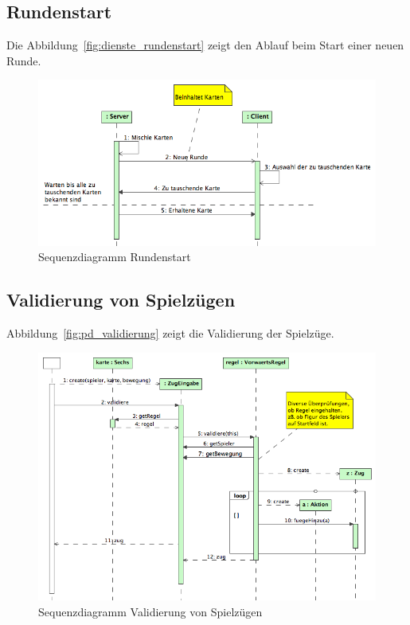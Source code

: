 \documentclass[12pt,halfparskip]{scrartcl}
\begin{document}
\subsection{Rundenstart}
\label{sub:rundenstart}
Die Abbildung~\vref{fig:dienste_rundenstart} zeigt den Ablauf beim Start einer neuen Runde.
\begin{figure}[h]
	\centering
	\includegraphics[width=0.7 \textwidth]{dienste_rundenstart}
	\caption{Sequenzdiagramm Rundenstart}
	\label{fig:dienste_rundenstart}
\end{figure}

\clearpage
\subsection{Validierung von Spielzügen}
\label{ssub:validierung_von_spielzügen}
Abbildung~\vref{fig:pd_validierung} zeigt die Validierung der Spielzüge.
\begin{figure}[h]
	\centering
	\includegraphics[width=\textwidth]{pd_validierung}
	\caption{Sequenzdiagramm Validierung von Spielzügen}
	\label{fig:pd_validierung}
\end{figure}
\end{document}
